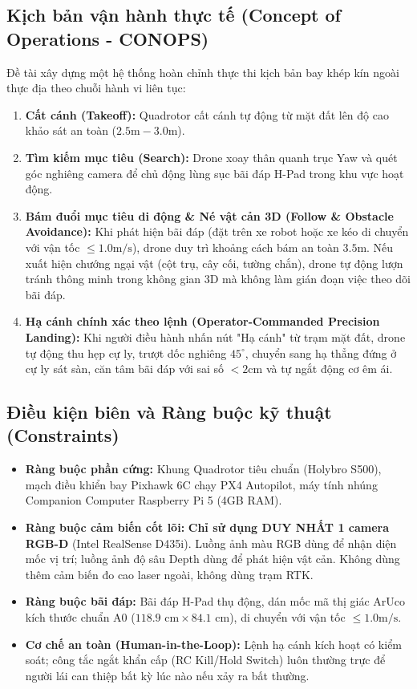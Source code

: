 \documentclass[12pt,a4paper]{article}
\begin{document}
\subsection{Kịch bản vận hành thực tế (Concept of Operations - CONOPS)}
Đề tài xây dựng một hệ thống hoàn chỉnh thực thi kịch bản bay khép kín ngoài thực địa theo chuỗi hành vi liên tục:
\begin{enumerate}[noitemsep,topsep=3pt]
    \item \textbf{Cất cánh (Takeoff):} Quadrotor cất cánh tự động từ mặt đất lên độ cao khảo sát an toàn ($2.5\text{m} - 3.0\text{m}$).
    \item \textbf{Tìm kiếm mục tiêu (Search):} Drone xoay thân quanh trục Yaw và quét góc nghiêng camera để chủ động lùng sục bãi đáp H-Pad trong khu vực hoạt động.
    \item \textbf{Bám đuổi mục tiêu di động \& Né vật cản 3D (Follow \& Obstacle Avoidance):} Khi phát hiện bãi đáp (đặt trên xe robot hoặc xe kéo di chuyển với vận tốc $\le 1.0\text{m/s}$), drone duy trì khoảng cách bám an toàn $3.5\text{m}$. Nếu xuất hiện chướng ngại vật (cột trụ, cây cối, tường chắn), drone tự động lượn tránh thông minh trong không gian 3D mà không làm gián đoạn việc theo dõi bãi đáp.
    \item \textbf{Hạ cánh chính xác theo lệnh (Operator-Commanded Precision Landing):} Khi người điều hành nhấn nút "Hạ cánh" từ trạm mặt đất, drone tự động thu hẹp cự ly, trượt dốc nghiêng $45^\circ$, chuyển sang hạ thẳng đứng ở cự ly sát sàn, căn tâm bãi đáp với sai số $< 2\text{cm}$ và tự ngắt động cơ êm ái.
\end{enumerate}

\subsection{Điều kiện biên và Ràng buộc kỹ thuật (Constraints)}
\begin{itemize}[noitemsep,topsep=2pt]
    \item \textbf{Ràng buộc phần cứng:} Khung Quadrotor tiêu chuẩn (Holybro S500), mạch điều khiển bay Pixhawk 6C chạy PX4 Autopilot, máy tính nhúng Companion Computer Raspberry Pi 5 (4GB RAM).
    \item \textbf{Ràng buộc cảm biến cốt lõi:} \textbf{Chỉ sử dụng DUY NHẤT 1 camera RGB-D} (Intel RealSense D435i). Luồng ảnh màu RGB dùng để nhận diện mốc vị trí; luồng ảnh độ sâu Depth dùng để phát hiện vật cản. Không dùng thêm cảm biến đo cao laser ngoài, không dùng trạm RTK.
    \item \textbf{Ràng buộc bãi đáp:} Bãi đáp H-Pad thụ động, dán mốc mã thị giác ArUco kích thước chuẩn A0 ($118.9\text{ cm} \times 84.1\text{ cm}$), di chuyển với vận tốc $\le 1.0\text{m/s}$.
    \item \textbf{Cơ chế an toàn (Human-in-the-Loop):} Lệnh hạ cánh kích hoạt có kiểm soát; công tắc ngắt khẩn cấp (RC Kill/Hold Switch) luôn thường trực để người lái can thiệp bất kỳ lúc nào nếu xảy ra bất thường.
\end{itemize}
\end{document}
